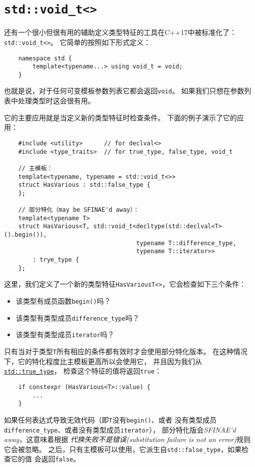 \section{\texttt{std::void\_t<>}}
还有一个很小但很有用的辅助定义类型特征的工具在C++17中被标准化了：\texttt{std::void\_t<>}。
它简单的按照如下形式定义：
\begin{lstlisting}
    namespace std {
        template<typename...> using void_t = void;
    }
\end{lstlisting}
也就是说，对于任何可变模板参数列表它都会返回\texttt{void}。
如果我们只想在参数列表中处理类型时这会很有用。

它的主要应用就是当定义新的类型特征时检查条件。
下面的例子演示了它的应用：
\begin{lstlisting}
    #include <utility>      // for declval<>
    #include <type_traits>  // for true_type, false_type, void_t

    // 主模板：
    template<typename, typename = std::void_t<>>
    struct HasVarious : std::false_type {
    };

    // 部分特化（may be SFINAE'd away）：
    template<typename T>
    struct HasVarious<T, std::void_t<decltype(std::declval<T>().begin()),
                                     typename T::difference_type,
                                     typename T::iterator>>
        : trye_type {
    };
\end{lstlisting}
这里，我们定义了一个新的类型特征\texttt{HasVariousT<>}，它会检查如下三个条件：
\begin{itemize}
    \item 该类型有成员函数\texttt{begin()}吗？
    \item 该类型有类型成员\texttt{difference\_type}吗？
    \item 该类型有类型成员\texttt{iterator}吗？
\end{itemize}
只有当对于类型\texttt{T}所有相应的条件都有效时才会使用部分特化版本。
在这种情况下，它的特化程度比主模板更高所以会使用它，
并且因为我们从\hyperref[ch33.2]{\texttt{std::true\_type}}，
检查这个特征的值将返回\texttt{true}：
\begin{lstlisting}
    if constexpr (HasVarious<T>::value) {
        ...
    }
\end{lstlisting}
如果任何表达式导致无效代码（即\texttt{T}没有\texttt{begin()}、或者
没有类型成员\texttt{difference\_type}、或者没有类型成员\texttt{iterator}），
部分特化版会\emph{SFINAE'd away}，这意味着根据
\emph{代换失败不是错误(substitution failure is not an error)}规则它会被忽略。
之后，只有主模板可以使用，它派生自\texttt{std::false\_type}，如果检查它的值
会返回\texttt{false}。

